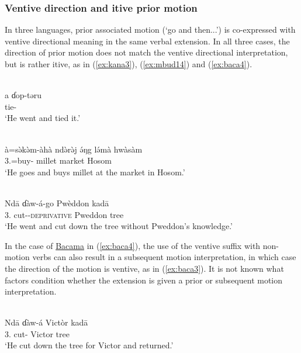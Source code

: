 \subsubsection{Ventive direction and itive prior motion}

In three languages, prior associated motion (`go and then...') is co-expressed with ventive directional meaning in the same verbal extension. In all three cases, the direction of prior motion does not match the ventive directional interpretation, but is rather itive, as in (\ref{ex:kana3}), (\ref{ex:mbud14}) and (\ref{ex:baca4}). 

\ea\label{ex:kana3}
 \\
\gll a	ɗop-təru \\
 tie- \\
\glt `He went and tied it.'

\ex\label{ex:mbud14}
 \\
\gll à=sə̀kə̀m-àhà ndə̀rə̀j ə́ŋg lə́mà hwàsàm	 \\
3.=buy- millet  market Hosom	\\
\glt `He goes and buys millet at the market in Hosom.' 

\ex\label{ex:baca4}
 \\
\gll Ndā ɗàw-á-go Pwèddon kadā	\\
3. cut--\textsc{deprivative} Pweddon tree		\\
\glt `He went and cut down the tree without Pweddon's knowledge.'
\z 

In the case of \hyperref[baca]{Bacama} in (\ref{ex:baca4}), the use of the ventive suffix with non-motion verbs can also result in a subsequent motion interpretation, in which case the direction of the motion is ventive, as in (\ref{ex:baca3}). It is not known what factors condition whether the extension is given a prior or subsequent motion interpretation.

\ea\label{ex:baca3}
 \\
\gll Ndā ɗàw-á Victòr kadā	\\
3. cut- Victor tree		\\
\glt `He cut down the tree for Victor and returned.'
\z 

